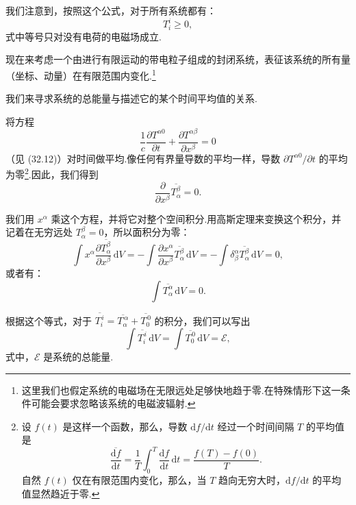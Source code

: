 我们注意到，按照这个公式，对于所有系统都有：
\begin{equation}
  T_i^i\geqslant0,
\end{equation}
式中等号只对没有电荷的电磁场成立.

现在来考虑一个由进行有限运动的带电粒子组成的封闭系统，表征该系统的所有量（坐标、动量）在有限范围内变化.\footnote{这里我们也假定系统的电磁场在无限远处足够快地趋于零.在特殊情形下这一条件可能会要求忽略该系统的电磁波辐射.}

我们来寻求系统的总能量与描述它的某个时间平均值的关系.

将方程
\begin{equation*}
  \frac{1}{c}\frac{\partial T^{\alpha 0}}{\partial t}
  +\frac{\partial T^{\alpha\beta}}{\partial x^\beta}=0
\end{equation*}
（见 (32.12)）对时间做平均.像任何有界量导数的平均一样，导数
$\partial T^{\alpha 0}/\partial t$ 的平均为零\footnote{设 $f(t)$ 是这样一个函数，那么，导数 $\mathrm{d}f/\mathrm{d}t$ 经过一个时间间隔 $T$ 的平均值是
\begin{equation*}
  \overline{\frac{\mathrm{d}f}{\mathrm{d}t}}=\frac{1}{T}\int_0^T\frac{\mathrm{d}f}{\mathrm{d}t}\,\mathrm{d}t=\frac{f(T)-f(0)}{T}.
\end{equation*}
自然 $f(t)$ 仅在有限范围内变化，那么，当 $T$ 趋向无穷大时，$\mathrm{d}f/\mathrm{d}t$ 的平均值显然趋近于零.}.因此，我们得到
\begin{equation*}
  \frac{\partial}{\partial x^\beta}\overline{T_\alpha^\beta}=0.
\end{equation*}

我们用 $x^\alpha$ 乘这个方程，并将它对整个空间积分.用高斯定理来变换这个积分，并记着在无穷远处
$T_\alpha^\beta=0$，所以面积分为零：
\begin{equation*}
  \int x^\alpha\frac{\partial\overline{T_\alpha^\beta}}{\partial x^\beta}\,\mathrm{d}V
  =-\int\frac{\partial x^\alpha}{\partial x^\beta}
  \overline{T_\alpha^\beta}\,\mathrm{d}V
  =-\int\delta_\beta^\alpha\overline{T_\alpha^\beta}\,\mathrm{d}V=0,
\end{equation*}
或者有：
\begin{equation}
  \int\overline{T_\alpha^\alpha}\,\mathrm{d}V=0.
\end{equation}

根据这个等式，对于
$\overline{T_i^{\,i}}=\overline{T_\alpha^{\,\alpha}}+\overline{T_0^{\,0}}$
的积分，我们可以写出
\begin{equation*}
  \int\overline{T_i^{\,i}}\,\mathrm{d}V
  =\int\overline{T_0^{\,0}}\,\mathrm{d}V=\mathcal{E},
\end{equation*}
式中，$\mathcal{E}$ 是系统的总能量.

